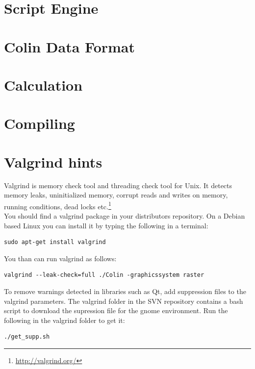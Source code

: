 \documentclass[a4paper,11pt]{report}
\begin{document}
\chapter{Script Engine}
\label{cha:scripting}

\chapter{Colin Data Format}
\label{cha:data}

\chapter{Calculation}
\label{cha:calculation}

\chapter{Compiling}
\label{cha:compile}

\chapter{Valgrind hints}
\label{cha:valgrind}
Valgrind is memory check tool and threading check tool for Unix. It detects memory leaks, uninitialized memory, corrupt reads and writes on memory, running conditions, dead locks etc.\footnote{\url{http://valgrind.org/}}\\
You should find a valgrind package in your distributors repository. On a Debian based Linux you can install it by typing the following in a terminal:

\begin{lstlisting}[frame=single, breaklines=true, basicstyle=\small]
sudo apt-get install valgrind
\end{lstlisting}

You than can run valgrind as follows:
\begin{lstlisting}[frame=single, breaklines=true, basicstyle=\small]
valgrind --leak-check=full ./Colin -graphicssystem raster
\end{lstlisting}

To remove warnings detected in libraries such as Qt, add suppression files to the valgrind parameters. The valgrind folder in the SVN repository contains a bash script to download the supression file for the gnome environment. Run the following in the valgrind folder to get it:
\begin{lstlisting}[frame=single, breaklines=true, basicstyle=\small]
./get_supp.sh
\end{lstlisting}
\end{document}
